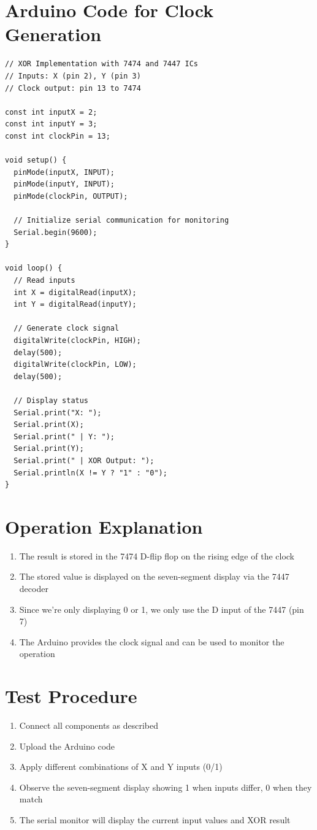 \documentclass[12pt,a4paper]{article}
\begin{document}
\section*{Arduino Code for Clock Generation}
\begin{verbatim}
// XOR Implementation with 7474 and 7447 ICs
// Inputs: X (pin 2), Y (pin 3)
// Clock output: pin 13 to 7474

const int inputX = 2;
const int inputY = 3;
const int clockPin = 13;

void setup() {
  pinMode(inputX, INPUT);
  pinMode(inputY, INPUT);
  pinMode(clockPin, OUTPUT);
  
  // Initialize serial communication for monitoring
  Serial.begin(9600);
}

void loop() {
  // Read inputs
  int X = digitalRead(inputX);
  int Y = digitalRead(inputY);
  
  // Generate clock signal
  digitalWrite(clockPin, HIGH);
  delay(500);
  digitalWrite(clockPin, LOW);
  delay(500);
  
  // Display status
  Serial.print("X: ");
  Serial.print(X);
  Serial.print(" | Y: ");
  Serial.print(Y);
  Serial.print(" | XOR Output: ");
  Serial.println(X != Y ? "1" : "0");
}
\end{verbatim}

\section*{Operation Explanation}
\begin{enumerate}
  \item The result is stored in the 7474 D-flip flop on the rising edge of the clock
  \item The stored value is displayed on the seven-segment display via the 7447 decoder
  \item Since we're only displaying 0 or 1, we only use the D input of the 7447 (pin 7)
  \item The Arduino provides the clock signal and can be used to monitor the operation
\end{enumerate}

\section*{Test Procedure}
\begin{enumerate}
  \item Connect all components as described
  \item Upload the Arduino code
  \item Apply different combinations of X and Y inputs (0/1)
  \item Observe the seven-segment display showing 1 when inputs differ, 0 when they match
  \item The serial monitor will display the current input values and XOR result
\end{enumerate}
\end{document}
